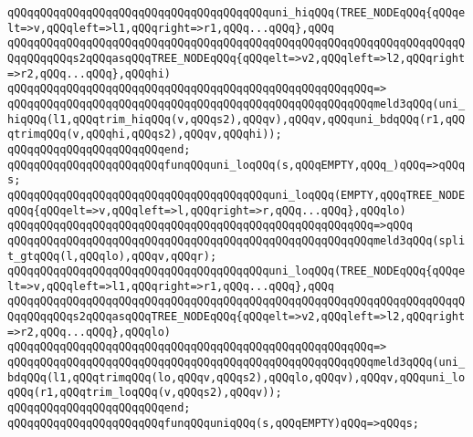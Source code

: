 \newline
\verb|qQQqqQQqqQQqqQQqqQQqqQQqqQQqqQQqqQQqqQQquni_hiqQQq(TREE_NODEqQQq{qQQqelt=>v,qQQqleft=>l1,qQQqright=>r1,qQQq...qQQq},qQQq|\newline
\verb|qQQqqQQqqQQqqQQqqQQqqQQqqQQqqQQqqQQqqQQqqQQqqQQqqQQqqQQqqQQqqQQqqQQqqQQqqQQqqQQqs2qQQqasqQQqTREE_NODEqQQq{qQQqelt=>v2,qQQqleft=>l2,qQQqright=>r2,qQQq...qQQq},qQQqhi)|\newline
\verb|qQQqqQQqqQQqqQQqqQQqqQQqqQQqqQQqqQQqqQQqqQQqqQQqqQQqqQQq=>|\newline
\verb|qQQqqQQqqQQqqQQqqQQqqQQqqQQqqQQqqQQqqQQqqQQqqQQqqQQqqQQqmeld3qQQq(uni_hiqQQq(l1,qQQqtrim_hiqQQq(v,qQQqs2),qQQqv),qQQqv,qQQquni_bdqQQq(r1,qQQqtrimqQQq(v,qQQqhi,qQQqs2),qQQqv,qQQqhi));|\newline
\verb|qQQqqQQqqQQqqQQqqQQqqQQqend;|\newline
\newline
\verb|qQQqqQQqqQQqqQQqqQQqqQQqfunqQQquni_loqQQq(s,qQQqEMPTY,qQQq_)qQQq=>qQQqs;|\newline
\newline
\verb|qQQqqQQqqQQqqQQqqQQqqQQqqQQqqQQqqQQqqQQquni_loqQQq(EMPTY,qQQqTREE_NODEqQQq{qQQqelt=>v,qQQqleft=>l,qQQqright=>r,qQQq...qQQq},qQQqlo)|\newline
\verb|qQQqqQQqqQQqqQQqqQQqqQQqqQQqqQQqqQQqqQQqqQQqqQQqqQQqqQQq=>qQQq|\newline
\verb|qQQqqQQqqQQqqQQqqQQqqQQqqQQqqQQqqQQqqQQqqQQqqQQqqQQqqQQqmeld3qQQq(split_gtqQQq(l,qQQqlo),qQQqv,qQQqr);|\newline
\newline
\verb|qQQqqQQqqQQqqQQqqQQqqQQqqQQqqQQqqQQqqQQquni_loqQQq(TREE_NODEqQQq{qQQqelt=>v,qQQqleft=>l1,qQQqright=>r1,qQQq...qQQq},qQQq|\newline
\verb|qQQqqQQqqQQqqQQqqQQqqQQqqQQqqQQqqQQqqQQqqQQqqQQqqQQqqQQqqQQqqQQqqQQqqQQqqQQqqQQqs2qQQqasqQQqTREE_NODEqQQq{qQQqelt=>v2,qQQqleft=>l2,qQQqright=>r2,qQQq...qQQq},qQQqlo)|\newline
\verb|qQQqqQQqqQQqqQQqqQQqqQQqqQQqqQQqqQQqqQQqqQQqqQQqqQQqqQQq=>|\newline
\verb|qQQqqQQqqQQqqQQqqQQqqQQqqQQqqQQqqQQqqQQqqQQqqQQqqQQqqQQqmeld3qQQq(uni_bdqQQq(l1,qQQqtrimqQQq(lo,qQQqv,qQQqs2),qQQqlo,qQQqv),qQQqv,qQQquni_loqQQq(r1,qQQqtrim_loqQQq(v,qQQqs2),qQQqv));|\newline
\verb|qQQqqQQqqQQqqQQqqQQqqQQqend;|\newline
\newline
\verb|qQQqqQQqqQQqqQQqqQQqqQQqfunqQQquniqQQq(s,qQQqEMPTY)qQQq=>qQQqs;|\newline
